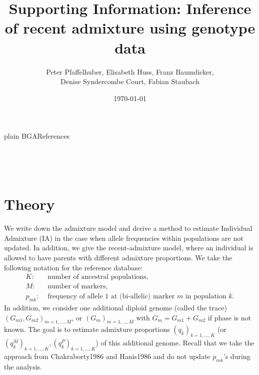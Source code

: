 \documentclass[12pt]{article}
\theoremstyle{definition}
\begin{document}
{plain}
{BGA}{References}
% 

\newpage
\setcounter{page}{1}
\setcounter{section}{0}
\setcounter{figure}{0}
\setcounter{table}{0}
\setcounter{equation}{0}
\thispagestyle{empty}

\begin{center}
 \title{\LARGE Supporting Information: Inference
  of recent admixture using genotype data}

~~

\author{\sc Peter Pfaffelhuber, Elisabeth Huss, Franz Baumdicker, \\
  \sc Denise Syndercombe Court, Fabian Staubach}

~

\date{\today}

\maketitle
  
\end{center}

\renewcommand{\theequation}{S\arabic{equation}}
\renewcommand{\thefigure}{S\arabic{figure}}
\renewcommand{\thetable}{S\arabic{table}}
\renewcommand{\thesection}{S\arabic{section}}


\section{Theory}
We write down the admixture model and derive a method to estimate
Individual Admixture (IA) in the case when allele frequencies within
populations are not updated. In addition, we give the recent-admixture
model, where an individual is allowed to have parents with different
admixture proportions. We take the following notation for the
reference database:
\begin{align*}
  K: & \text{ number of ancestral populations,}
  \\ M: & \text{ number of markers,}
  \\ p_{mk}: & \text{ frequency of allele 1 at (bi-allelic) marker $m$ in population $k$.}
\end{align*}
In addition, we consider one additional diploid genome (called the
trace) $(G_{m1}, G_{m2})_{m=1,...,M}$, or $(G_m)_{m=1,...,M}$ with
$G_m = G_{m1} + G_{m2}$ if phase is not known. The goal is to estimate
admixture proportions $(q_k)_{k=1,...,K}$ (or
$(q^M_{k})_{k=1,...,K}, (q^P_{k})_{k=1,...,K}$) of this additional
genome.  Recall that we take the approach from
\cite{SI}{Chakraborty1986} and \cite{SI}{Hanis1986} and do
not update $p_{mk}$'s during the analysis.
\end{document}

